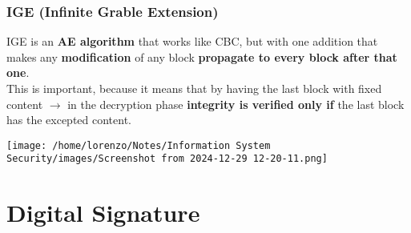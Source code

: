 \begin{customquote}
\vspace{-0.4cm}
\subsubsection{IGE (Infinite Grable Extension)}
\begin{minipage}{0.5\textwidth}
	\vspace{-0.5cm}
IGE is an \textbf{AE algorithm} that works like
CBC, but with one addition that makes
any \textbf{modification} of any block \textbf{propagate
to every block after that one}.\\
This is important, because it means that
by having the last block with fixed content
\(\rightarrow \) in the decryption phase \textbf{integrity is verified only if} the last block has the excepted content. 
\end{minipage} 
\hspace{0cm}
\begin{minipage}{0.4\textwidth}
    \centering
    \texttt{[image: /home/lorenzo/Notes/Information System Security/images/Screenshot from 2024-12-29 12-20-11.png]}
\end{minipage}

\end{customquote}

\section{Digital Signature}